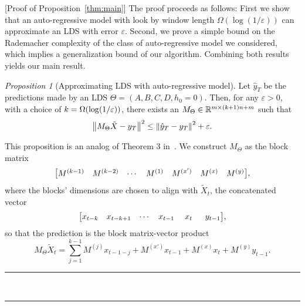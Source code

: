 \documentclass[10pt]{article} \usepackage[accepted]{tmlr}
\theoremstyle{plain}
\newtheorem{proposition}[theorem]{Proposition}
\theoremstyle{definition}
\theoremstyle{remark}
\def\eps{\varepsilon}
\newcommand{\BlackBox}{\rule{1.5ex}{1.5ex}}  \fi
\newenvironment{proof}{\par\noindent{\bf Proof\ }}{\hfill\BlackBox\\[2mm]}
\newtheorem{proposition}{Proposition}
\let\originalleft\left
\let\originalright\right
\renewcommand{\left}{\mathopen{}\mathclose\bgroup\originalleft}
\renewcommand{\right}{\aftergroup\egroup\originalright}
\newcommand{\rbr}[1]{\left({#1}\right)}
\newcommand{\norm}[1]{\left\|{#1}\right\|}
\newcommand{\bra}[1]{\left[#1\right]}
\newcommand{\mat}[1]{\begin{matrix}#1\end{matrix}}
\newcommand{\bmat}[1]{\bra{\mat{#1}}}
\begin{document}
\begin{proof}[Proof of Proposition~\ref{thm:main}]
The proof proceeds as follows: First we show that an auto-regressive model with look by window length $\Omega(\log(1/\eps))$ can approximate an LDS with error $\eps$. Second, we prove a simple bound on the Rademacher complexity of the class of auto-regressive model we considered, which implies a generalization bound of our algorithm. Combining both results yields our main result. 
\begin{proposition}[Approximating LDS with auto-regressive model]
\label{thm:main-appx-relaxation}
Let $\hat{y}_T$ be the predictions made by an LDS $\Theta = (A,B,C,D,h_0 = 0)$. Then, for any $\eps > 0$, with a choice of $k = \Omega \rbr{\log (1/\eps)}$, there exists an $M_\Theta \in \mathbb{R}^{m \times (k+1)n+m}$ such that
\[ \norm{M_{\Theta} \tilde X - y_T}^2 \leq \norm{\hat y_T - y_T}^2 + \eps. \]
\end{proposition}

\begin{proof}
This proposition is an analog of Theorem 3 in~\citep{hazan2017learning}. We construct $M_{\Theta}$ as the block matrix
\[\bmat{ M^{(k-1)} & M^{(k-2)} & \cdots & M^{(1)} & M^{(x')} & M^{(x)} & M^{(y)} },\]
where the blocks' dimensions are chosen to align with $\tilde X_t$, the concatenated vector
\[\bmat{ x_{t-k} & x_{t-k+1} & \cdots & x_{t-1} & \; x_t \; & \; y_{t-1} },\]
so that the prediction is the block matrix-vector product
\[ M_{\Theta} \tilde X_t = \sum_{j=1}^{k-1} M^{(j)} x_{t-1-j} + M^{(x')} x_{t-1} + M^{(x)} x_t + M^{(y)} y_{t-1}. \]


\end{proof}
\end{proof}
\end{document}
